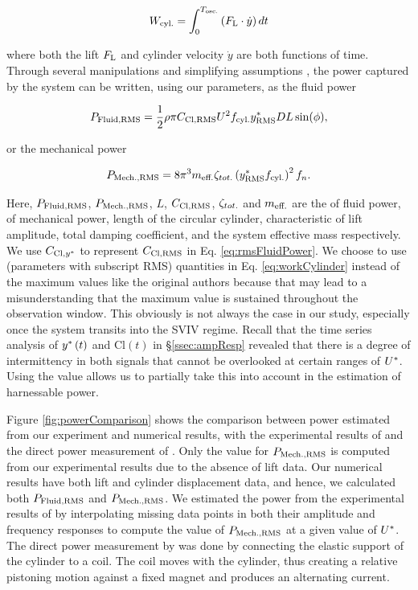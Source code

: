 \documentclass[a4paper,fleqn]{cas-sc}
\begin{document}
\begin{equation}
  W_{\text{cyl.}} = \int_{0}^{T_{\text{osc.}}} \left ( F_{\text{L}} \cdot \dot{y} \right ) dt
  \label{eq:workCylinder}
\end{equation}

\noindent where both the lift $F_{\text{L}}$ and cylinder velocity $\dot{y}$ are both functions of time. Through several manipulations and simplifying assumptions \citep{Sun2016}, the power captured by the system can be written, using our parameters, as the fluid power

\begin{equation}
  P_{\text{Fluid,RMS}} = \frac{1}{2} \rho \pi C_{\text{Cl},\text{RMS}} U^{2} f_{\text{cyl.}} y^{*}_{\text{RMS}} D L \sin(\phi),
  \label{eq:rmsFluidPower}
\end{equation}

\noindent or the mechanical power

\begin{equation}
  P_{\text{Mech.,RMS}} = 8 \pi^{3} m_{\text{eff.}} \zeta_{tot.} \left (y^{*}_{\text{RMS}} f_{\text{cyl.}} \right )^{2} f_{n}.
  \label{eq:rmsMechPower}
\end{equation}

Here, $P_{\text{Fluid,RMS}}$, $P_{\text{Mech.,RMS}}$, $L$, $C_{\text{Cl},\text{RMS}}$, $\zeta_{tot.}$ and $m_{\text{eff.}}$ are the \rms{} of fluid power, \rms{} of mechanical power, length of the circular cylinder, characteristic \rms{} of lift amplitude, total damping coefficient, and the system effective mass respectively. We use $C_{\text{Cl},y^{*}}$ to represent $C_{\text{Cl},\text{RMS}}$ in Eq. \ref{eq:rmsFluidPower}. We choose to use \rms{} (parameters with subscript RMS) quantities in Eq. \ref{eq:workCylinder} instead of the maximum values like the original authors because that may lead to a misunderstanding that the maximum value is sustained throughout the observation window. This obviously is not always the case in our study, especially once the system transits into the SVIV regime. Recall that the time series analysis of $y^{*}\left( t \right)$ and $\text{Cl}\left( t \right)$ in \S\ref{ssec:ampResp} revealed that there is a degree of intermittency in both signals that cannot be overlooked at certain ranges of $U^{*}$. Using the \rms{} value allows us to partially take this into account in the estimation of harnessable power.

Figure \ref{fig:powerComparison} shows the comparison between power estimated from our experiment and numerical results, with the experimental results of \citet{Nguyen2012} and the direct power measurement of \citet{Koide2013}. Only the value for $P_{\text{Mech.,RMS}}$ is computed from our experimental results due to the absence of lift data. Our numerical results have both lift and cylinder displacement data, and hence, we calculated both $P_{\text{Fluid,RMS}}$ and $P_{\text{Mech.,RMS}}$. We estimated the power from the experimental results of \citet{Nguyen2012} by interpolating missing data points in both their amplitude and frequency responses to compute the value of $P_{\text{Mech.,RMS}}$ at a given value of $U^{*}$. The direct power measurement by \citet{Koide2013} was done by connecting the elastic support of the cylinder to a coil. The coil moves with the cylinder, thus creating a relative pistoning motion against a fixed magnet and produces an alternating current.
\end{document}
